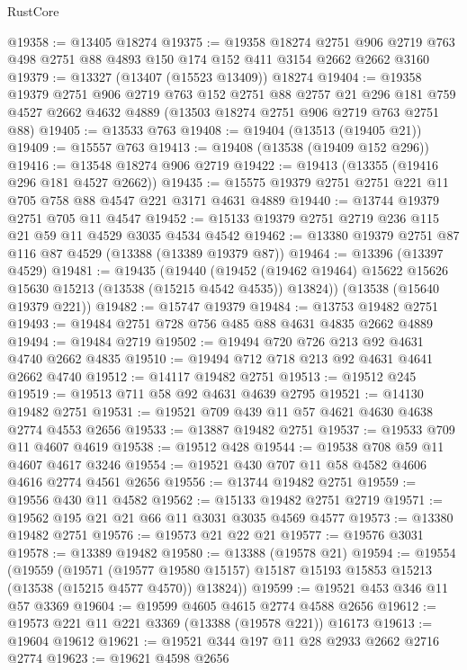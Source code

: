 \begin{lexlean}{RustCore}
\begin{coremodule}
@19358 := @13405 @18274
@19375 := @19358
    @18274
    @2751
    @906
    @2719
    @763
    @498
    @2751
    @88
    @4893
    @150
    @174
    @152
    @411
    @3154
    @2662
    @2662
    @3160
@19379 := @13327 (@13407 (@15523 @13409)) @18274
@19404 := @19358
    @19379
    @2751
    @906
    @2719
    @763
    @152
    @2751
    @88
    @2757
    @21
    @296
    @181
    @759
    @4527
    @2662
    @4632
    @4889
    (@13503 @18274 @2751 @906 @2719 @763 @2751 @88)
@19405 := @13533 @763
@19408 := @19404 (@13513 (@19405 @21))
@19409 := @15557 @763
@19413 := @19408 (@13538 (@19409 @152 @296))
@19416 := @13548 @18274 @906 @2719
@19422 := @19413 (@13355 (@19416 @296 @181 @4527 @2662))
@19435 := @15575 @19379 @2751 @2751 @221 @11 @705 @758 @88 @4547 @221 @3171 @4631 @4889
@19440 := @13744 @19379 @2751 @705 @11 @4547
@19452 := @15133 @19379 @2751 @2719 @236 @115 @21 @59 @11 @4529 @3035 @4534 @4542
@19462 := @13380 @19379 @2751 @87 @116 @87 @4529 (@13388 (@13389 @19379 @87))
@19464 := @13396 (@13397 @4529)
@19481 := @19435
    (@19440
      (@19452 (@19462 @19464) @15622 @15626 @15630 @15213 (@13538 (@15215 @4542 @4535)) @13824))
    (@13538 (@15640 @19379 @221))
@19482 := @15747 @19379
@19484 := @13753 @19482 @2751
@19493 := @19484 @2751 @728 @756 @485 @88 @4631 @4835 @2662 @4889
@19494 := @19484 @2719
@19502 := @19494 @720 @726 @213 @92 @4631 @4740 @2662 @4835
@19510 := @19494 @712 @718 @213 @92 @4631 @4641 @2662 @4740
@19512 := @14117 @19482 @2751
@19513 := @19512 @245
@19519 := @19513 @711 @58 @92 @4631 @4639 @2795
@19521 := @14130 @19482 @2751
@19531 := @19521 @709 @439 @11 @57 @4621 @4630 @4638 @2774 @4553 @2656
@19533 := @13887 @19482 @2751
@19537 := @19533 @709 @11 @4607 @4619
@19538 := @19512 @428
@19544 := @19538 @708 @59 @11 @4607 @4617 @3246
@19554 := @19521 @430 @707 @11 @58 @4582 @4606 @4616 @2774 @4561 @2656
@19556 := @13744 @19482 @2751
@19559 := @19556 @430 @11 @4582
@19562 := @15133 @19482 @2751 @2719
@19571 := @19562 @195 @21 @21 @66 @11 @3031 @3035 @4569 @4577
@19573 := @13380 @19482 @2751
@19576 := @19573 @21 @22 @21
@19577 := @19576 @3031
@19578 := @13389 @19482
@19580 := @13388 (@19578 @21)
@19594 := @19554
    (@19559
      (@19571
        (@19577 @19580 @15157)
        @15187
        @15193
        @15853
        @15213
        (@13538 (@15215 @4577 @4570))
        @13824))
@19599 := @19521 @453 @346 @11 @57 @3369
@19604 := @19599 @4605 @4615 @2774 @4588 @2656
@19612 := @19573 @221 @11 @221 @3369 (@13388 (@19578 @221)) @16173
@19613 := @19604 @19612
@19621 := @19521 @344 @197 @11 @28 @2933 @2662 @2716 @2774
@19623 := @19621 @4598 @2656

\end{coremodule}
\end{lexlean}
